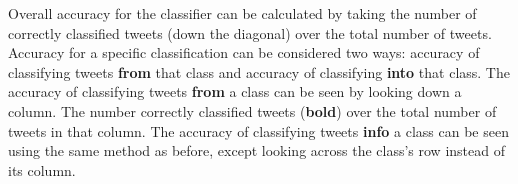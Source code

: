 \documentclass[12pt]{ucthesis}
\begin{document}
Overall accuracy for the classifier can be calculated by taking the number of correctly classified tweets (down the diagonal) over the total number of tweets.
Accuracy for a specific classification can be considered two ways: accuracy of classifying tweets \textbf{from} that class and accuracy of classifying \textbf{into} that class.
The accuracy of classifying tweets \textbf{from} a class can be seen by looking down a column.
The number correctly classified tweets (\textbf{bold}) over the total number of tweets in that column.
The accuracy of classifying tweets \textbf{info} a class can be seen using the same method as before, except looking across the class's row instead of its column.

\begin{table}[H]
   \begin{center}
      \caption[Example Classification Confusion Matrix]{A example confusion matrix for a classifier. The \texttt{undecided} class was removed because there were no tweets in that class.}
      \label{table:confusionExample}
   \end{center}
\end{table}
\end{document}
